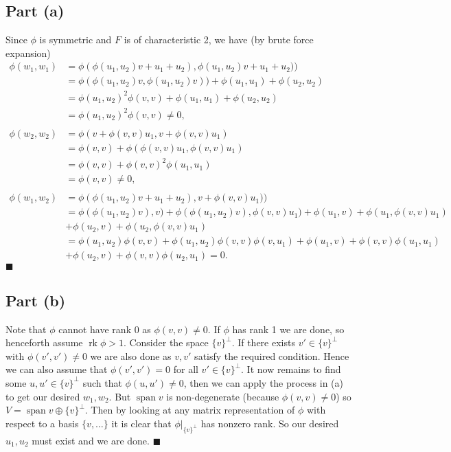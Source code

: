 \documentclass[12pt]{article}
\DeclareMathOperator{\rk}{rk}
\DeclareMathOperator{\spn}{span}
\begin{document}
\subsection*{Part (a)}
Since $\phi$ is symmetric and $F$ is of characteristic 2, we have
(by brute force expansion)
\begin{align*}
    \phi(w_1,w_1)
    &=\phi(
        \phi(u_1, u_2)v + u_1 + u_2),
        \phi(u_1, u_2)v + u_1 + u_2))
  \\&=
    \phi(\phi(u_1, u_2)v, \phi(u_1, u_2)v))
    +\phi(u_1, u_1)
    +\phi(u_2, u_2)
  \\&= \phi(u_1, u_2)^2\phi(v, v)
    +\phi(u_1, u_1)
    +\phi(u_2, u_2)
  \\&= \phi(u_1, u_2)^2\phi(v, v) \neq 0,
\\
\\\phi(w_2,w_2)
    &=\phi(
        v+\phi(v,v)u_1,
        v+\phi(v,v)u_1)
  \\&=\phi(v, v)
    +\phi(\phi(v,v)u_1, \phi(v, v)u_1)
  \\&=\phi(v, v)
    +\phi(v,v)^2\phi(u_1, u_1)
  \\&=\phi(v,v)\neq 0,
  \\
    \\\phi(w_1,w_2)
    &=\phi(
        \phi(u_1, u_2)v + u_1 + u_2),
        v+\phi(v,v)u_1))
  \\&=
    \phi(\phi(u_1, u_2)v), v)
    +\phi(\phi(u_1, u_2)v), \phi(v,v)u_1)
    +\phi(u_1,v)
    +\phi(u_1, \phi(v,v)u_1)
  \\&+\phi(u_2,v)
    +\phi(u_2, \phi(v,v)u_1)
  \\&=
    \phi(u_1,u_2)\phi(v, v)
    +\phi(u_1, u_2)\phi(v,v)\phi(v, u_1)
    +\phi(u_1,v)
    +\phi(v,v)\phi(u_1, u_1)
  \\&+\phi(u_2,v)
    +\phi(v,v)\phi(u_2, u_1) = 0.
\end{align*}
\hfill$\blacksquare$

\subsection*{Part (b)}
Note that $\phi$ cannot have rank 0 as $\phi(v,v)\neq0$. If $\phi$ has rank 1
we are done, so henceforth assume $\rk\phi>1$. Consider the space $\{v\}^\perp$.
If there exists $v'\in \{v\}^\perp$ with $\phi(v',v')\neq 0$ we are also done
as $v, v'$ satisfy the required condition. Hence we can also assume
that $\phi(v',v')=0$ for all $v'\in\{v\}^\perp$. It now remains to
find some $u,u'\in \{v\}^\perp$ such that $\phi(u,u')\neq 0$, then we can
apply the process in (a) to get our desired $w_1,w_2$. But
$\spn{v}$ is non-degenerate (because $\phi(v,v)\neq 0$) so
$V = \spn{v}\oplus\{v\}^\perp$. Then by looking at any matrix representation
of $\phi$
with respect to a basis $\{v, \ldots\}$ it is clear that $\phi|_{\{v\}^\perp}$
has nonzero rank. So our desired $u_1,u_2$ must exist and we are done.
\hfill$\blacksquare$
\end{document}
